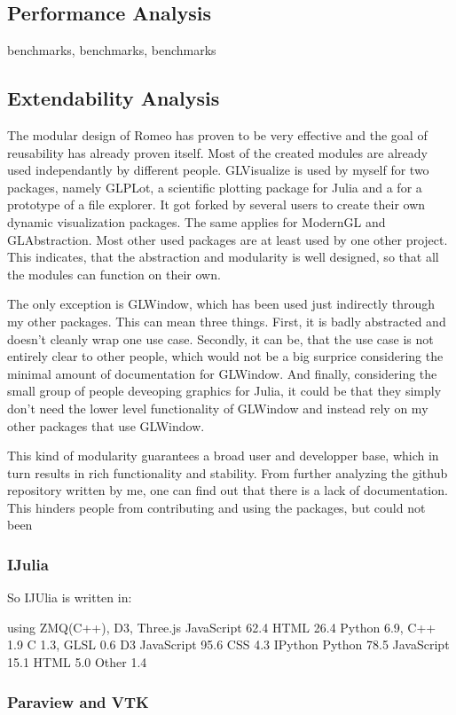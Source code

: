 \subsection{Performance Analysis}
benchmarks, benchmarks, benchmarks
\subsection{Extendability Analysis}
The modular design of Romeo has proven to be very effective and the goal of reusability has already proven itself.
Most of the created modules are already used independantly by different people.
GLVisualize is used by myself for two packages, namely GLPLot, a scientific plotting package for Julia and a for a prototype of a file explorer. 
It got forked by several users to create their own dynamic visualization packages.
The same applies for ModernGL and GLAbstraction. Most other used packages are at least used by one other project.
This indicates, that the abstraction and modularity is well designed, so that all the modules can function on their own.

The only exception is GLWindow, which has been used just indirectly through my other packages. 
This can mean three things.
First, it is badly abstracted and doesn't cleanly wrap one use case.
Secondly, it can be, that the use case is not entirely clear to other people, which would not be a big surprice considering the minimal amount of documentation for GLWindow.
And finally, considering the small group of people deveoping graphics for Julia, it could be that they simply don't need the lower level functionality of GLWindow and instead rely on my other packages that use GLWindow.

This kind of modularity guarantees a broad user and developper base, which in turn results in rich functionality and stability.
From further analyzing the github repository written by me, one can find out that there is a lack of documentation.
This hinders people from contributing and using the packages, but could not been 

\subsubsection{IJulia}
So IJUlia is written in:

using ZMQ(C++), D3, 
Three.js
JavaScript 62.4	 HTML 26.4	 Python 6.9,	 C++ 1.9	 C 1.3,	 GLSL 0.6
D3
JavaScript 95.6	 CSS 4.3
IPython
Python 78.5	 JavaScript 15.1	 HTML 5.0	 Other 1.4

\subsubsection{Paraview and VTK}


